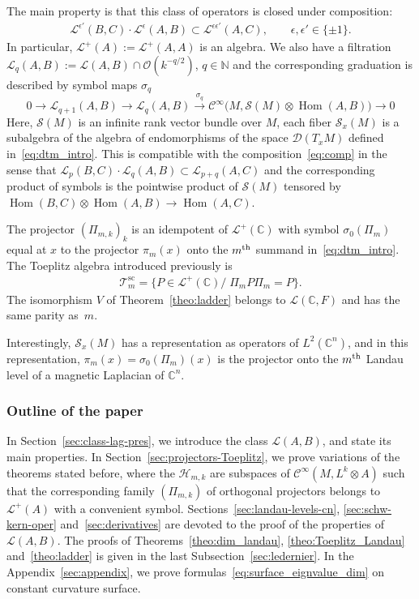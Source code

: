 \documentclass[10pt,a4paper]{article}
\theoremstyle{definition}
\numberwithin{equation}{section}
\newcommand{\N}{{\mathbb{N}}}
\newcommand{\C}{{\mathbb{C}}}
\newcommand{\si}{{\sigma}}
\newcommand{\ep}{\epsilon}
\newcommand{\op}{\operatorname}
\newcommand{\Ci}{{\mathcal{C}}^{\infty}}
\newcommand{\bigo}{\mathcal{O}}
\newcommand{\D}{\mathcal{D}}
\newcommand{\symb}{\mathcal{S}}
\newcommand{\lag}{\mathcal{L}}
\newcommand{\Hilb}{\mathcal{H}}
\newcommand{\clT}{\mathcal{T}}
\begin{document}
The main property is that this class of operators is closed under composition:
\begin{gather}\label{eq:comp}
\lag^{\ep'} (B, C) \cdot \lag^{\ep} (A,B) \subset \lag^{\ep \ep'} (A,C),
\qquad \ep, \ep' \in \{ \pm 1\}.
\end{gather}
In particular, $\lag^+ (A) := \lag^{+} (A,A)$ is an algebra. We also have a filtration $ \lag_q(A,B) := \lag (A,B) \cap
\bigo (k^{-q/2})$, $q \in \N$ and the corresponding graduation is described by symbol maps $\si_q$
\[
0 \rightarrow \lag_{q+1} (A,B) \rightarrow \lag_q (A,B) \xrightarrow{\si_q} \Ci \big(M
, \symb (M) \otimes \op{Hom} (A,B)\big) \rightarrow 0
\]
Here, $\symb (M)$ is an infinite rank vector bundle over $M$, each fiber $\symb_x(M)$ is a subalgebra of the algebra of endomorphisms of the space $\D (T_xM)$ defined in~\eqref{eq:dtm_intro}. This is compatible with the composition~\eqref{eq:comp} in the sense that $\lag_p (B,C) \cdot \lag_q (A,B) \subset \lag_{p+q} (A,C)$ and the corresponding product of symbols is the pointwise product of $\symb(M)$ tensored by $\op{Hom} (B,C) \otimes \op{Hom} (A,B) \rightarrow \op{Hom} (A,C)$.


The projector $(\Pi_{m,k})_k$ is an idempotent of $\lag^+ (\C)$ with symbol $\si_0 (\Pi_{m})$ equal at $x$ to the projector $\pi_m (x)$ onto the $m^{\rm th}$ summand in~\eqref{eq:dtm_intro}. The Toeplitz algebra introduced previously is
\begin{gather}\label{eq:toep_land}
\clT_m^{\op{sc}} = \big\{ P
\in \lag^{+} (\C) / \; \Pi_m P \Pi_m = P \big\}.
\end{gather}
The isomorphism $V$ of Theorem~\ref{theo:ladder} belongs to $\lag (\C, F)$ and has the same parity as~$m$.

Interestingly, $\symb_x(M)$ has a representation as operators of $L^2 (\C^n)$, and in this representation, $ \pi_m(x) = \si_0 (\Pi_m)(x)$ is the projector onto the $m^{\rm th}$ Landau level of a magnetic Laplacian of $\C^n$.


\break
\subsubsection{Outline of the paper}
In Section~\ref{sec:class-lag-pres}, we introduce the class $\lag (A,B)$, and state its main properties. In Section~\ref{sec:projectors-Toeplitz}, we prove variations of the theorems stated before, where the $\Hilb_{m,k}$ are subspaces of $\Ci (M, L^k \otimes A)$ such that the corresponding family $(\Pi_{m,k})$ of orthogonal projectors belongs to $\lag^+ (A)$ with a convenient symbol. Sections~\ref{sec:landau-levels-cn}, \ref{sec:schw-kern-oper} and~\ref{sec:derivatives} are devoted to the proof of the properties of $\lag (A,B)$. The proofs of Theorems~\ref{theo:dim_landau}, \ref{theo:Toeplitz_Landau} and~\ref{theo:ladder} is given in the last Subsection~\ref{sec:ledernier}. In the Appendix~\ref{sec:appendix}, we prove formulas~\eqref{eq:surface_eignvalue_dim} on constant curvature surface.
\end{document}
